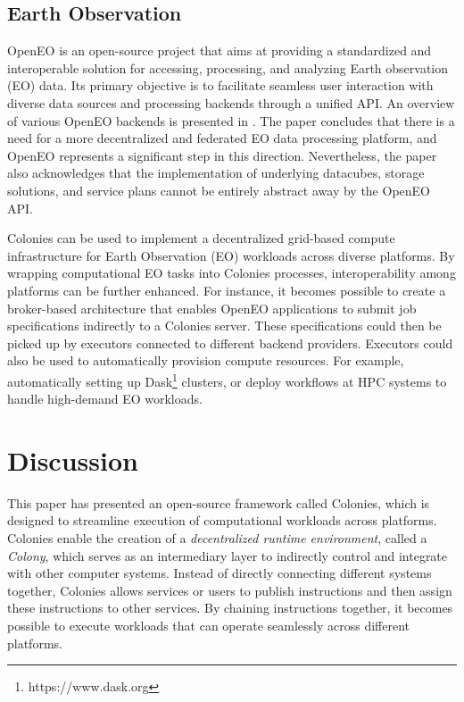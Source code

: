 \documentclass{article}
\begin{document}
\subsection{Earth Observation}
OpenEO \cite{openeo} is an open-source project that aims at providing a standardized and interoperable solution for accessing, processing, and analyzing Earth observation (EO) data. Its primary objective is to facilitate seamless user interaction with diverse data sources and processing backends through a unified API. An overview of various OpenEO backends is presented in \cite{openeo_backends}. The paper concludes that there is a need for a more decentralized and federated EO data processing platform, and OpenEO represents a significant step in this direction. Nevertheless, the paper also acknowledges that the implementation of underlying datacubes, storage solutions, and service plans cannot be entirely abstract away by the OpenEO API.


Colonies can be used to implement a decentralized grid-based compute infrastructure for Earth Observation (EO) workloads across diverse platforms. By wrapping computational EO tasks into Colonies processes, interoperability among platforms can be further enhanced. For instance, it becomes possible to create a broker-based architecture that enables OpenEO applications to submit job specifications indirectly to a Colonies server. These specifications could then be picked up by executors connected to different backend providers. Executors could also be used to automatically provision compute resources. For example, automatically setting up Dask\footnote{https://www.dask.org} clusters, or deploy workflows at HPC systems to handle high-demand EO workloads. 

\section{Discussion}
This paper has presented an open-source framework called Colonies, which is designed to streamline execution of computational workloads across platforms. Colonies enable the creation of a \emph{decentralized runtime environment}, called a \emph{Colony}, which serves as an intermediary layer to indirectly control and integrate with other computer systems. Instead of directly connecting different systems together, Colonies allows services or users to publish instructions and then assign these instructions to other services. By chaining instructions together, it becomes possible to execute workloads that can operate seamlessly across different platforms. 
\end{document}
